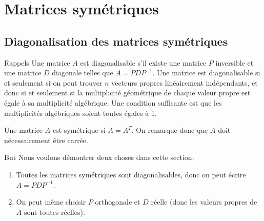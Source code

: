 \documentclass[a4paper]{article}
\begin{document}
\section{Matrices symétriques}
\subsection{Diagonalisation des matrices symétriques}
\begin{parag}{Rappels}
    Une matrice $A$ est diagonalisable s'il existe une matrice $P$ inversible et une matrice $D$ diagonale telles que $A = PDP^{-1}$. Une matrice est diagonalisable si et seulement si on peut trouver $n$ vecteurs propres linéairement indépendants, et donc si et seulement si la multiplicité géométrique de chaque valeur propre est égale à sa multiplicité algébrique. Une condition suffisante est que les multiplicités algébriques soient toutes égales à 1.

    Une matrice $A$ est symétrique si $A = A^T$. On remarque donc que $A$ doit nécessairement être carrée.
\end{parag}

\begin{parag}{But}
    Nous voulons démontrer deux choses dans cette section:
    \begin{enumerate}
        \item Toutes les matrices symétriques sont diagonalisables, donc on peut écrire $A = PDP^{-1}$.
        \item On peut même choisir $P$ orthogonale et $D$ réelle (donc les valeurs propres de $A$ sont toutes réelles).
    \end{enumerate}
\end{parag}
\end{document}
